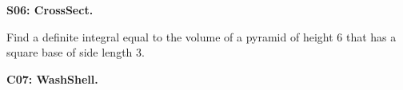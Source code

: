 \documentclass[12pt]{article}
\newcommand{\<}{\left\langle}
\renewcommand{\>}{\right\rangle}
\newcommand{\exerciseHeader}[4]{


  \vspace{0.5em}
  \textbf{#2}
  \vspace{0.5em}

}
\begin{document}
\begin{multicols}{2}
\exerciseHeader{2017 June 23}{S06: CrossSect.}{
Express an area between curves as a definite integral.
}{3/3}

Find a definite integral equal to the volume of a pyramid of height
\(6\) that has a square base of side length \(3\).



%

%

%
%
%

%
%
%
%
\exerciseHeader{2017 July 07}{C07: WashShell.}{
Use the washer or cylindrical shell method to express a volume of
revolution as a definite integral.
}{Extra2}


\end{multicols}
\end{document}
